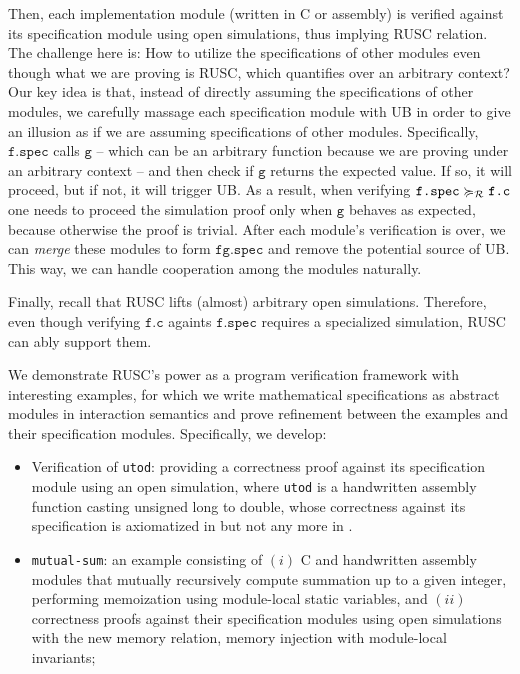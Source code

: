 Then, each implementation module (written in C or assembly) is verified against its specification module using open simulations, thus implying RUSC relation.
The challenge here is: How to utilize the specifications of other modules even though what we are proving is RUSC, which quantifies over an arbitrary context?
Our key idea is that, instead of directly assuming the specifications of other modules, we carefully massage each specification module with UB in order to give an illusion as if we are assuming specifications of other modules.
Specifically, $\texttt{f.spec}$ calls $\texttt{g}$ -- which can be an arbitrary function because we are proving under an arbitrary context -- and then check if $\texttt{g}$ returns the expected value. If so, it will proceed, but if not, it will trigger UB.
As a result, when verifying $\texttt{f.spec} \succcurlyeq_{\mathcal{R}} \texttt{f.c}$ one needs to proceed the simulation proof only when $\texttt{g}$ behaves as expected, because otherwise the proof is trivial.
After each module's verification is over, we can {\it merge} these modules to form $\texttt{fg.spec}$ and remove the potential source of UB.
This way, we can handle cooperation among the modules naturally.

Finally, recall that RUSC lifts (almost) arbitrary open simulations.
Therefore, even though verifying $\texttt{f.c}$ againts $\texttt{f.spec}$ requires a specialized simulation, RUSC can ably support them.


We demonstrate RUSC's power as a program verification framework with interesting
examples, for which we write mathematical specifications as abstract
modules in interaction semantics and prove refinement between the
examples and their specification modules.  Specifically, we develop:
\begin{itemize}
\item Verification of \texttt{utod}: providing a correctness proof
  against its specification module using an open simulation,
  where \texttt{utod} is a handwritten
  assembly function casting unsigned long to double, whose correctness
  against its specification is axiomatized in \cc{} but not any more
  in \ccm{}.
\item \texttt{mutual-sum}: an example consisting of $(i)$ C and
  handwritten assembly modules that mutually recursively compute
  summation up to a given integer, performing memoization using
  module-local static variables, and $(ii)$ correctness proofs
  against their specification modules using open simulations with the
  new memory relation, memory injection with module-local invariants;
\end{itemize}
\medskip


